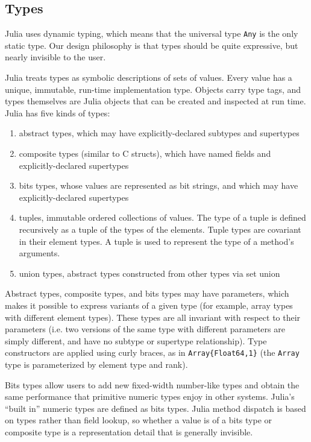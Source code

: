 \documentclass[9pt]{sigplanconf}
\begin{document}
\subsection{Types}


Julia uses dynamic typing, which means that the universal type {\tt Any}
is the only static type. Our design philosophy is that types should be
quite expressive, but nearly invisible to the user.

Julia treats types as symbolic descriptions of sets of values. Every value has
a unique, immutable, run-time implementation type. Objects carry type tags, and
types themselves are Julia objects that can be created and inspected
at run time.
Julia has five kinds of types:

\begin{enumerate}
\item abstract types, which may have explicitly-declared subtypes and supertypes
\item composite types (similar to C structs), which have named fields and
      explicitly-declared supertypes
\item bits types, whose values are represented as bit strings, and which may
      have explicitly-declared supertypes
\item tuples, immutable ordered collections of values. The type of a tuple is
defined recursively as a tuple of the types of the elements. Tuple types are
covariant in their element types. A tuple is used to represent the type of a
method's arguments.
\item union types, abstract types constructed from other types via set union
\end{enumerate}

Abstract types, composite types, and bits types may have parameters, which
makes it possible to express variants of a given type (for example, array types
with different element types). These types are all invariant with respect to
their parameters (i.e. two versions of the same type with different parameters
are simply different, and have no subtype or supertype relationship). Type
constructors are applied using curly braces, as in {\tt Array\{Float64,1\}}
(the {\tt Array} type is parameterized by element type and rank).

Bits types allow users to add new fixed-width number-like types and obtain the
same performance that primitive numeric types enjoy in other systems. Julia's
``built in'' numeric types are defined as bits types. Julia method dispatch
is based on types rather than field lookup, so whether a value is of a bits
type or composite type is a representation detail that is generally
invisible.
\end{document}
